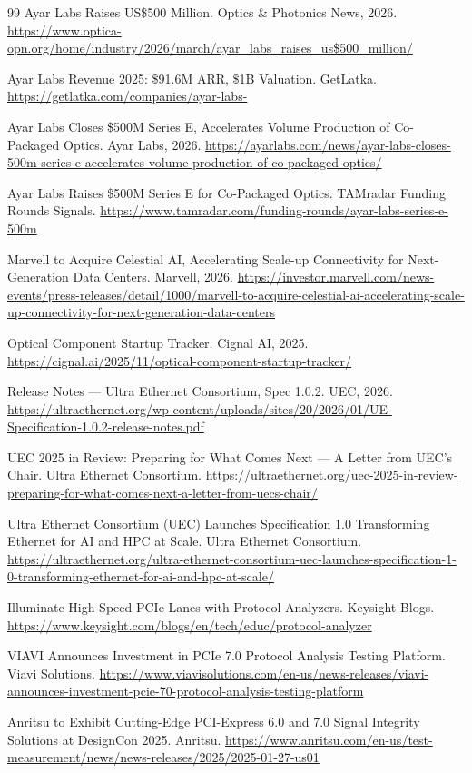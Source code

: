 \begin{thebibliography}{99}
 Ayar Labs Raises US\$500 Million. Optics \& Photonics News, 2026. \url{https://www.optica-opn.org/home/industry/2026/march/ayar_labs_raises_us\$500_million/}

 Ayar Labs Revenue 2025: \$91.6M ARR, \$1B Valuation. GetLatka. \url{https://getlatka.com/companies/ayar-labs-}

 Ayar Labs Closes \$500M Series E, Accelerates Volume Production of Co-Packaged Optics. Ayar Labs, 2026. \url{https://ayarlabs.com/news/ayar-labs-closes-500m-series-e-accelerates-volume-production-of-co-packaged-optics/}

 Ayar Labs Raises \$500M Series E for Co-Packaged Optics. TAMradar Funding Rounds Signals. \url{https://www.tamradar.com/funding-rounds/ayar-labs-series-e-500m}

 Marvell to Acquire Celestial AI, Accelerating Scale-up Connectivity for Next-Generation Data Centers. Marvell, 2026. \url{https://investor.marvell.com/news-events/press-releases/detail/1000/marvell-to-acquire-celestial-ai-accelerating-scale-up-connectivity-for-next-generation-data-centers}

 Optical Component Startup Tracker. Cignal AI, 2025. \url{https://cignal.ai/2025/11/optical-component-startup-tracker/}

 Release Notes --- Ultra Ethernet Consortium, Spec 1.0.2. UEC, 2026. \url{https://ultraethernet.org/wp-content/uploads/sites/20/2026/01/UE-Specification-1.0.2-release-notes.pdf}

 UEC 2025 in Review: Preparing for What Comes Next --- A Letter from UEC's Chair. Ultra Ethernet Consortium. \url{https://ultraethernet.org/uec-2025-in-review-preparing-for-what-comes-next-a-letter-from-uecs-chair/}

 Ultra Ethernet Consortium (UEC) Launches Specification 1.0 Transforming Ethernet for AI and HPC at Scale. Ultra Ethernet Consortium. \url{https://ultraethernet.org/ultra-ethernet-consortium-uec-launches-specification-1-0-transforming-ethernet-for-ai-and-hpc-at-scale/}

 Illuminate High-Speed PCIe Lanes with Protocol Analyzers. Keysight Blogs. \url{https://www.keysight.com/blogs/en/tech/educ/protocol-analyzer}

 VIAVI Announces Investment in PCIe 7.0 Protocol Analysis Testing Platform. Viavi Solutions. \url{https://www.viavisolutions.com/en-us/news-releases/viavi-announces-investment-pcie-70-protocol-analysis-testing-platform}

 Anritsu to Exhibit Cutting-Edge PCI-Express 6.0 and 7.0 Signal Integrity Solutions at DesignCon 2025. Anritsu. \url{https://www.anritsu.com/en-us/test-measurement/news/news-releases/2025/2025-01-27-us01}

\end{thebibliography}
